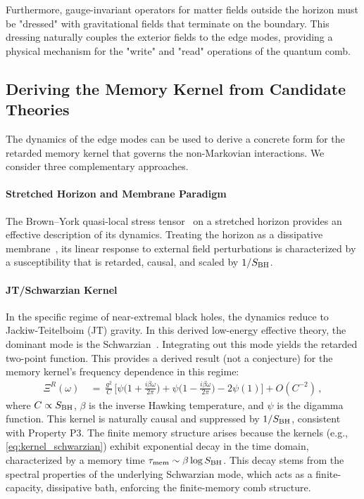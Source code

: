 \documentclass[a4paper,11pt]{article}
\newcommand{\eg}{e.g.\xspace}
\theoremstyle{plain}
\theoremstyle{definition}
\theoremstyle{remark}
\begin{document}
Furthermore, gauge-invariant operators for matter fields outside the horizon must be "dressed" with gravitational fields that terminate on the boundary. This dressing naturally couples the exterior fields to the edge modes, providing a physical mechanism for the "write" and "read" operations of the quantum comb.

\subsection{Deriving the Memory Kernel from Candidate Theories}
\label{sec:derive_qg}
The dynamics of the edge modes can be used to derive a concrete form for the retarded memory kernel that governs the non-Markovian interactions. We consider three complementary approaches.

\paragraph{Stretched Horizon and Membrane Paradigm} The Brown--York quasi-local stress tensor~\cite{BrownYork:1993, Iyer:1994} on a stretched horizon provides an effective description of its dynamics. Treating the horizon as a dissipative membrane~\cite{Thorne:1986}, its linear response to external field perturbations is characterized by a susceptibility that is retarded, causal, and scaled by $1/S_{\rm BH}$.

\paragraph{JT/Schwarzian Kernel} In the specific regime of near-extremal black holes, the dynamics reduce to Jackiw-Teitelboim (JT) gravity. In this derived low-energy effective theory, the dominant mode is the Schwarzian~\cite{MSY:2016, Jensen:2016}. Integrating out this mode yields the retarded two-point function. This provides a derived result (not a conjecture) for the memory kernel's frequency dependence in this regime:
\begin{align}
\Xi^R(\omega)\ &=\ \frac{g^2}{C}\,\Big[\psi\!\Big(1+\frac{i \beta \omega}{2\pi}\Big)+\psi\!\Big(1-\frac{i \beta \omega}{2\pi}\Big) - 2\psi(1)\Big] + O(C^{-2})\,,
\label{eq:kernel_schwarzian}
\end{align}
where $C \propto S_{\rm BH}$, $\beta$ is the inverse Hawking temperature, and $\psi$ is the digamma function. This kernel is naturally causal and suppressed by $1/S_{\rm BH}$, consistent with Property P3.
The finite memory structure arises because the kernels (\eg, \eqref{eq:kernel_schwarzian}) exhibit exponential decay in the time domain, characterized by a memory time $\tau_{\rm mem} \sim \beta \log S_{\rm BH}$. This decay stems from the spectral properties of the underlying Schwarzian mode, which acts as a finite-capacity, dissipative bath, enforcing the finite-memory comb structure.
\end{document}
